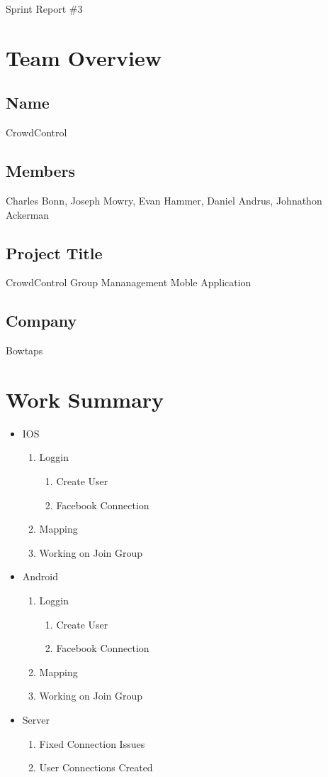 \documentclass[11pt]{article}
\begin{document}
{\fontsize{16}{16}\selectfont Sprint  Report \#3}

\section*{Team Overview}

\subsection*{Name}
CrowdControl
\subsection*{Members}
Charles Bonn, Joseph Mowry, Evan Hammer, Daniel Andrus, Johnathon Ackerman
\subsection*{Project Title}
CrowdControl Group Mananagement Moble Application
\subsection*{Company}
Bowtaps

\section*{Work Summary}
	\begin{itemize}
	\item IOS
		\begin{enumerate}
		\item Loggin
			\begin{enumerate}
			\item Create User
			\item Facebook Connection
			\end{enumerate}
		\item Mapping
		\item Working on Join Group
		\end{enumerate}
	\item Android
		\begin{enumerate}
		\item Loggin
			\begin{enumerate}
			\item Create User
			\item Facebook Connection
			\end{enumerate}
		\item Mapping
		\item Working on Join Group
		\end{enumerate}
	\item Server
		\begin{enumerate}
		\item Fixed Connection Issues
		\item User Connections Created
		\end{enumerate}

	\end{itemize}
\end{document}
